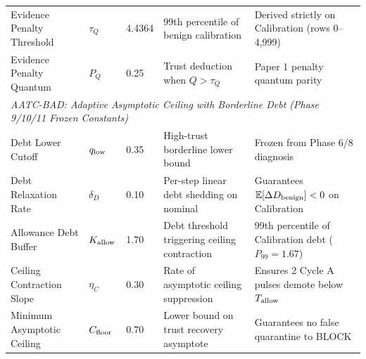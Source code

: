 \begin{table}[t]
\begin{tabular}{lllll}
Evidence Penalty Threshold & $\tau_Q$ & 4.4364 & 99th percentile of benign calibration & Derived strictly on Calibration (rows 0--4,999) \\
Evidence Penalty Quantum & $P_Q$ & 0.25 & Trust deduction when $Q > \tau_Q$ & Paper 1 penalty quantum parity \\
\hline
\multicolumn{5}{l}{\textit{AATC-BAD: Adaptive Asymptotic Ceiling with Borderline Debt (Phase 9/10/11 Frozen Constants)}} \\
Debt Lower Cutoff & $q_{\rm low}$ & 0.35 & High-trust borderline lower bound & Frozen from Phase 6/8 diagnosis \\
Debt Relaxation Rate & $\delta_D$ & 0.10 & Per-step linear debt shedding on nominal & Guarantees $\mathbb{E}[\Delta D_{\rm benign}] < 0$ on Calibration \\
Allowance Debt Buffer & $K_{\rm allow}$ & 1.70 & Debt threshold triggering ceiling contraction & 99th percentile of Calibration debt ($P_{99} = 1.67$) \\
Ceiling Contraction Slope & $\eta_C$ & 0.30 & Rate of asymptotic ceiling suppression & Ensures 2 Cycle A pulses demote below $T_{\rm allow}$ \\
Minimum Asymptotic Ceiling & $C_{\rm floor}$ & 0.70 & Lower bound on trust recovery asymptote & Guarantees no false quarantine to BLOCK \\
\hline
\end{tabular}
\end{table}

